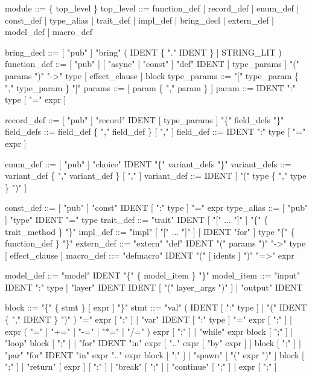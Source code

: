 \documentclass[
  english,
  oneside]{book}
\newenvironment{Shaded}{\begin{snugshade}}{\end{snugshade}}
\newcommand{\NormalTok}[1]{\textcolor[rgb]{0.83,0.83,0.83}{#1}}
\begin{document}
\begin{Shaded}
\begin{Highlighting}[]
\NormalTok{module       ::= \{ top\_level \}}
\NormalTok{top\_level    ::= function\_def | record\_def | enum\_def | const\_def}
\NormalTok{               | type\_alias | trait\_def | impl\_def | bring\_decl}
\NormalTok{               | extern\_def | model\_def | macro\_def}

\NormalTok{bring\_decl   ::= [ "pub" ] "bring" ( IDENT \{ "." IDENT \} | STRING\_LIT )}
\NormalTok{function\_def ::= [ "pub" ] [ "async" | "const" ] "def" IDENT [ type\_params ]}
\NormalTok{                 "(" params ")" "{-}\textgreater{}" type [ effect\_clause ] block}
\NormalTok{type\_params  ::= "[" type\_param \{ "," type\_param \} "]"}
\NormalTok{params       ::= [ param \{ "," param \} ]}
\NormalTok{param        ::= IDENT ":" type [ "=" expr ]}

\NormalTok{record\_def   ::= [ "pub" ] "record" IDENT [ type\_params ] "\{" field\_defs "\}"}
\NormalTok{field\_defs   ::= field\_def \{ "," field\_def \} [ "," ]}
\NormalTok{field\_def    ::= IDENT ":" type [ "=" expr ]}

\NormalTok{enum\_def     ::= [ "pub" ] "choice" IDENT "\{" variant\_defs "\}"}
\NormalTok{variant\_defs ::= variant\_def \{ "," variant\_def \} [ "," ]}
\NormalTok{variant\_def  ::= IDENT [ "(" type \{ "," type \} ")" ]}

\NormalTok{const\_def    ::= [ "pub" ] "const" IDENT [ ":" type ] "=" expr}
\NormalTok{type\_alias   ::= [ "pub" ] "type" IDENT "=" type}
\NormalTok{trait\_def    ::= "trait" IDENT [ "[" ... "]" ] "\{" \{ trait\_method \} "\}"}
\NormalTok{impl\_def     ::= "impl" [ "[" ... "]" ] [ IDENT "for" ] type "\{" \{ function\_def \} "\}"}
\NormalTok{extern\_def   ::= "extern" "def" IDENT "(" params ")" "{-}\textgreater{}" type [ effect\_clause ]}
\NormalTok{macro\_def    ::= "defmacro" IDENT "(" [ idents ] ")" "=\textgreater{}" expr}

\NormalTok{model\_def    ::= "model" IDENT "\{" \{ model\_item \} "\}"}
\NormalTok{model\_item   ::= "input" IDENT ":" type}
\NormalTok{               | "layer" IDENT IDENT [ "(" layer\_args ")" ]}
\NormalTok{               | "output" IDENT}

\NormalTok{block        ::= "\{" \{ stmt \} [ expr ] "\}"}
\NormalTok{stmt         ::= "val" ( IDENT [ ":" type ] | "(" IDENT \{ "," IDENT \} ")" ) "=" expr [ ";" ]}
\NormalTok{               | "var" IDENT [ ":" type ] "=" expr [ ";" ]}
\NormalTok{               | expr ( "=" | "+=" | "{-}=" | "*=" | "/=" ) expr [ ";" ]}
\NormalTok{               | "while" expr block [ ";" ]}
\NormalTok{               | "loop" block [ ";" ]}
\NormalTok{               | "for" IDENT "in" expr [ ".." expr [ "by" expr ] ] block [ ";" ]}
\NormalTok{               | "par" "for" IDENT "in" expr ".." expr block [ ";" ]}
\NormalTok{               | "spawn" [ "(" expr ")" ] block [ ";" ]}
\NormalTok{               | "return" [ expr ] [ ";" ]}
\NormalTok{               | "break" [ ";" ]}
\NormalTok{               | "continue" [ ";" ]}
\NormalTok{               | expr [ ";" ]}
\end{Highlighting}
\end{Shaded}
\end{document}
